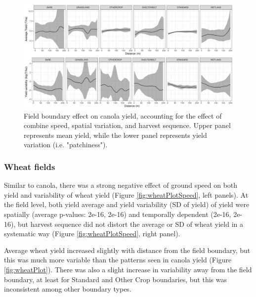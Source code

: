 \documentclass[]{elsarticle} %
\begin{document}
\begin{figure}
\includegraphics[width=1\linewidth]{../Figures/ModelSummary3a_canola} \caption{Field boundary effect on canola yield, accounting for the effect of combine speed, spatial variation, and harvest sequence. Upper panel represents mean yield, while the lower panel represents yield variation (i.e. "patchiness").}\label{fig:canolaPlot}
\end{figure}

\hypertarget{wheat-fields}{%
\subsubsection{Wheat fields}\label{wheat-fields}}

Similar to canola, there was a strong negative effect of ground speed on both yield and variability of wheat yield (Figure \ref{fig:wheatPlotSpeed}, left panels).
At the field level, both yield average and yield variability (SD of yield) of yield were spatially (average p-values: 2e-16, 2e-16) and temporally dependent (2e-16, 2e-16), but harvest sequence did not distort the average or SD of wheat yield in a systematic way (Figure \ref{fig:wheatPlotSpeed}, right panel).

Average wheat yield increased slightly with distance from the field boundary, but this was much more variable than the patterns seen in canola yield (Figure \ref{fig:wheatPlot}).
There was also a slight increase in variability away from the field boundary, at least for Standard and Other Crop boundaries, but this was inconsistent among other boundary types.
\end{document}
